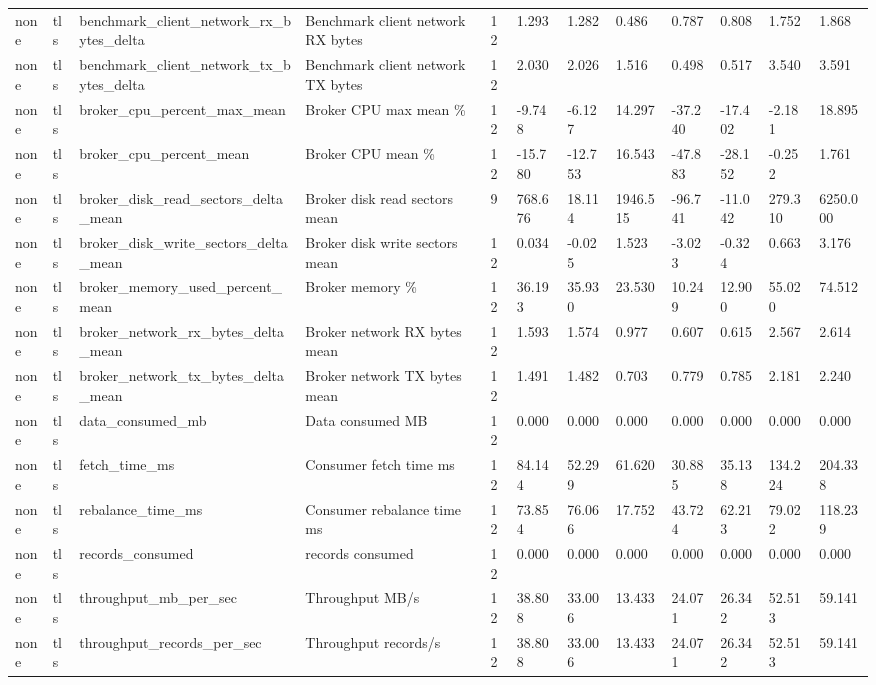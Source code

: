 \begin{longtable}{llllllllllll}
none & tls & benchmark\_client\_network\_rx\_bytes\_delta & Benchmark client network RX bytes & 12 & 1.293 & 1.282 & 0.486 & 0.787 & 0.808 & 1.752 & 1.868 \\
none & tls & benchmark\_client\_network\_tx\_bytes\_delta & Benchmark client network TX bytes & 12 & 2.030 & 2.026 & 1.516 & 0.498 & 0.517 & 3.540 & 3.591 \\
none & tls & broker\_cpu\_percent\_max\_mean & Broker CPU max mean \% & 12 & -9.748 & -6.127 & 14.297 & -37.240 & -17.402 & -2.181 & 18.895 \\
none & tls & broker\_cpu\_percent\_mean & Broker CPU mean \% & 12 & -15.780 & -12.753 & 16.543 & -47.883 & -28.152 & -0.252 & 1.761 \\
none & tls & broker\_disk\_read\_sectors\_delta\_mean & Broker disk read sectors mean & 9 & 768.676 & 18.114 & 1946.515 & -96.741 & -11.042 & 279.310 & 6250.000 \\
none & tls & broker\_disk\_write\_sectors\_delta\_mean & Broker disk write sectors mean & 12 & 0.034 & -0.025 & 1.523 & -3.023 & -0.324 & 0.663 & 3.176 \\
none & tls & broker\_memory\_used\_percent\_mean & Broker memory \% & 12 & 36.193 & 35.930 & 23.530 & 10.249 & 12.900 & 55.020 & 74.512 \\
none & tls & broker\_network\_rx\_bytes\_delta\_mean & Broker network RX bytes mean & 12 & 1.593 & 1.574 & 0.977 & 0.607 & 0.615 & 2.567 & 2.614 \\
none & tls & broker\_network\_tx\_bytes\_delta\_mean & Broker network TX bytes mean & 12 & 1.491 & 1.482 & 0.703 & 0.779 & 0.785 & 2.181 & 2.240 \\
none & tls & data\_consumed\_mb & Data consumed MB & 12 & 0.000 & 0.000 & 0.000 & 0.000 & 0.000 & 0.000 & 0.000 \\
none & tls & fetch\_time\_ms & Consumer fetch time ms & 12 & 84.144 & 52.299 & 61.620 & 30.885 & 35.138 & 134.224 & 204.338 \\
none & tls & rebalance\_time\_ms & Consumer rebalance time ms & 12 & 73.854 & 76.066 & 17.752 & 43.724 & 62.213 & 79.022 & 118.239 \\
none & tls & records\_consumed & records consumed & 12 & 0.000 & 0.000 & 0.000 & 0.000 & 0.000 & 0.000 & 0.000 \\
none & tls & throughput\_mb\_per\_sec & Throughput MB/s & 12 & 38.808 & 33.006 & 13.433 & 24.071 & 26.342 & 52.513 & 59.141 \\
none & tls & throughput\_records\_per\_sec & Throughput records/s & 12 & 38.808 & 33.006 & 13.433 & 24.071 & 26.342 & 52.513 & 59.141 \\
\hline
\end{longtable}
